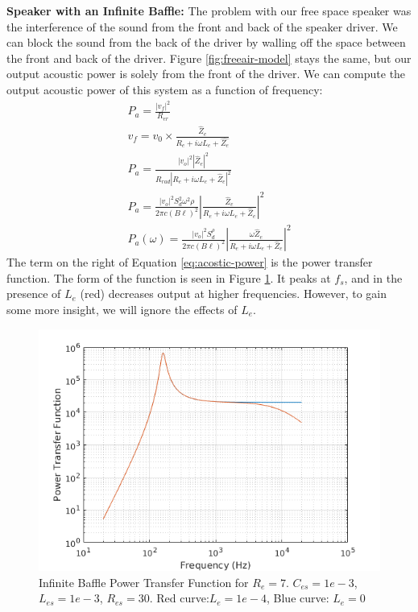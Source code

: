 \documentclass[10pt,letterpaper]{article}
\begin{document}
\textbf{Speaker with an Infinite Baffle:} The problem with our free space speaker was the interference of the sound from the front and back of the speaker driver. We can block the sound from the back of the driver by walling off the space between the front and back of the driver. Figure \ref{fig:freeair-model} stays the same, but our output acoustic power is solely from the front of the driver. We can compute the output acoustic power of this system as a function of frequency:
\begin{align}
P_a=\frac{\left| v_f \right|^2}{R_{er}}\\
v_f=v_0\times\frac{\hat{Z}_e}{R_e+i\omega L_e+\hat{Z_e}}\\
P_a=\frac{\left| v_o \right|^2 \left| \hat{Z}_e \right|^2 }{R_{rad}\left| R_e+i\omega L_e+\hat{Z}_e\right|^2}\\
P_a=\frac{\left| v_o \right|^2S_d^2\omega^2 \rho}{
2\pi c (B\ell)^2 
}\left| \frac{ \hat{Z}_e }{ R_e+i\omega L_e+\hat{Z}_e} \right|^2\\
P_a(\omega)=\frac{\left| v_o \right|^2S_d^ \rho}{
2\pi c (B\ell)^2 
}\left| \frac{\omega  \hat{Z}_e }{ R_e+i\omega L_e+\hat{Z}_e} \right|^2 \label{eq:acostic-power}
\end{align}
The term on the right of Equation \ref{eq:acostic-power} is the power transfer function. The form of the function is seen in Figure \ref{fig:power-transfer}. It peaks at $f_s$, and in the presence of $L_e$ (red) decreases output at higher frequencies. However, to gain some more insight, we will ignore the effects of $L_e$.

\begin{figure}
\centering
\includegraphics[width=.75\textwidth]{matlab/infiniteBafflePower.png}
\caption{Infinite Baffle Power Transfer Function for $R_e=7$.
$C_{es}=1e-3$, $L_{es}=1e-3$, $R_{es}=30$. Red curve:$L_e=1e-4$, Blue curve: $L_e=0$}\label{fig:power-transfer}
\end{figure}
\end{document}
